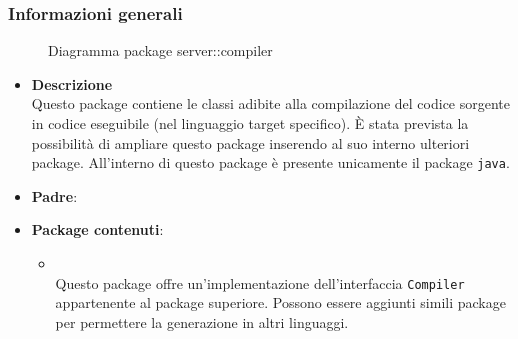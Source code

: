 \subsubsection{Informazioni generali}
\begin{figure}[H]
	\caption{Diagramma package server::compiler}
\end{figure}
\begin{itemize}
\item \textbf{Descrizione}\\
Questo package contiene le classi adibite alla compilazione del codice sorgente in codice eseguibile (nel linguaggio target specifico). È stata prevista la possibilità di ampliare questo package inserendo al suo interno ulteriori package. All'interno di questo package è presente unicamente il package \texttt{java}.
\item \textbf{Padre}: \hyperref[\nogloxy{swedesigner::server}]{}
\item \textbf{Package contenuti}:
\begin{itemize}
\item \hyperref[\nogloxy{swedesigner::server::compiler::java}]{}\\
Questo package offre un'implementazione dell'interfaccia \texttt{Compiler} appartenente al package superiore. Possono essere aggiunti simili package per permettere la generazione in altri linguaggi.
\end{itemize}
\end{itemize}
